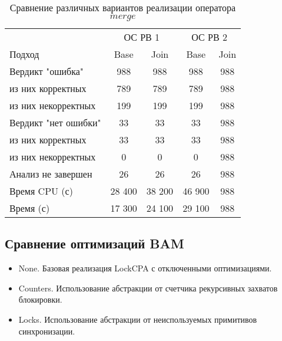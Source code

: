 \begin{center}
  \begin{table}[h]\footnotesize
  	\label{table-os-lock-merge}
    \caption{Сравнение различных вариантов реализации оператора $merge$}
    \begin{tabular}{ | l | c | c | c | c | }
      \hline
      		& 		\multicolumn{2}{|c|}{ОС РВ 1} & \multicolumn{2}{|c|}{ОС РВ 2}  \\
      Подход         				& Base 	& Join 	& Base 	& Join   	\\ \hline
      Вердикт "ошибка" 				& 988   & 988   & 988   & 988   	\\ 
  \hspace{0.5cm} из них корректных 	& 789 	& 789 	& 789   & 988     	\\ 
  \hspace{0.5cm} из них некорректных & 199 	& 199 	& 199   & 988     	\\ \hline
      Вердикт "нет ошибки"  		& 33    & 33    & 33    & 988      	\\ 
  \hspace{0.5cm} из них корректных 	& 33 	& 33    & 33    & 988     	\\
  \hspace{0.5cm} из них некорректных & 0 	& 0    	& 0     & 988  		\\ \hline
      Анализ не завершен       		& 26    & 26    & 26    & 988     	\\ \hline
      Время CPU (с)   				& 28 400 & 38 200 & 46 900 & 988   	\\ 
      Время (с)  					& 17 300 & 24 100 & 29 100 & 988 	\\
      \hline
    \end{tabular}
  \end{table}
\end{center}

\subsection{Сравнение оптимизаций BAM}

\begin{itemize}
\item None. Базовая реализация LockCPA с отключенными оптимизациями.
\item Counters. Использование абстракции от счетчика рекурсивных захватов блокировки.
\item Locks. Использование абстракции от неиспользуемых примитивов синхронизации.
\end{itemize}


